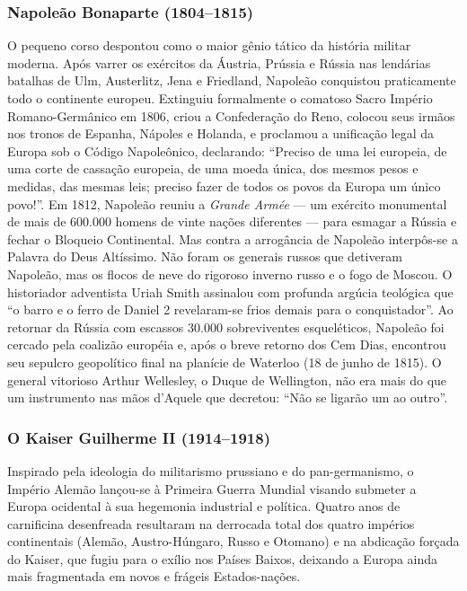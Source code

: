 \subsubsection*{Napoleão Bonaparte (1804–1815)}
O pequeno corso despontou como o maior gênio tático da história militar moderna. Após varrer os exércitos da Áustria, Prússia e Rússia nas lendárias batalhas de Ulm, Austerlitz, Jena e Friedland, Napoleão conquistou praticamente todo o continente europeu. Extinguiu formalmente o comatoso Sacro Império Romano-Germânico em 1806, criou a Confederação do Reno, colocou seus irmãos nos tronos de Espanha, Nápoles e Holanda, e proclamou a unificação legal da Europa sob o Código Napoleônico, declarando: ``Preciso de uma lei europeia, de uma corte de cassação europeia, de uma moeda única, dos mesmos pesos e medidas, das mesmas leis; preciso fazer de todos os povos da Europa um único povo!''.
Em 1812, Napoleão reuniu a \textit{Grande Armée} — um exército monumental de mais de 600.000 homens de vinte nações diferentes — para esmagar a Rússia e fechar o Bloqueio Continental. Mas contra a arrogância de Napoleão interpôs-se a Palavra do Deus Altíssimo. Não foram os generais russos que detiveram Napoleão, mas os flocos de neve do rigoroso inverno russo e o fogo de Moscou. O historiador adventista Uriah Smith assinalou com profunda argúcia teológica que ``o barro e o ferro de Daniel 2 revelaram-se frios demais para o conquistador''. Ao retornar da Rússia com escassos 30.000 sobreviventes esqueléticos, Napoleão foi cercado pela coalizão européia e, após o breve retorno dos Cem Dias, encontrou seu sepulcro geopolítico final na planície de Waterloo (18 de junho de 1815). O general vitorioso Arthur Wellesley, o Duque de Wellington, não era mais do que um instrumento nas mãos d'Aquele que decretou: ``Não se ligarão um ao outro''.


\subsubsection*{O Kaiser Guilherme II (1914–1918)}
Inspirado pela ideologia do militarismo prussiano e do pan-germanismo, o Império Alemão lançou-se à Primeira Guerra Mundial visando submeter a Europa ocidental à sua hegemonia industrial e política. Quatro anos de carnificina desenfreada resultaram na derrocada total dos quatro impérios continentais (Alemão, Austro-Húngaro, Russo e Otomano) e na abdicação forçada do Kaiser, que fugiu para o exílio nos Países Baixos, deixando a Europa ainda mais fragmentada em novos e frágeis Estados-nações.


